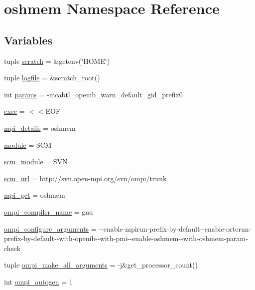 \hypertarget{namespaceoshmem}{\section{oshmem Namespace Reference}
\label{namespaceoshmem}
}
\subsection*{Variables}
\begin{DoxyCompactItemize}
\item 
tuple \hyperlink{namespaceoshmem_ac804c2050f1631747356112f02a6fa05}{scratch} = \&getenv(\char`\"{}H\-O\-M\-E\char`\"{})
\item 
tuple \hyperlink{namespaceoshmem_a0dd8ce9816b9130b80561197098590a2}{logfile} = \&scratch\-\_\-root()
\item 
int \hyperlink{namespaceoshmem_ab8b5930fba684193f3e00879ebb696b4}{params} = -\/mcabtl\-\_\-openib\-\_\-warn\-\_\-default\-\_\-gid\-\_\-prefix0
\item 
\hyperlink{namespaceoshmem_a024aa040d2607b8bd6fb76522b0978c3}{exec} = $<$$<$E\-O\-F
\item 
\hyperlink{namespaceoshmem_aeba1fd4df4f5814da0588fb749d7acfa}{mpi\-\_\-details} = oshmem
\item 
\hyperlink{namespaceoshmem_a9406859c141622f8f2f7210af080e99c}{module} = S\-C\-M
\item 
\hyperlink{namespaceoshmem_ab8796141a8629f1cfaedd19737a327c4}{scm\-\_\-module} = S\-V\-N
\item 
\hyperlink{namespaceoshmem_a6be12ee0b0ec67ddd588e8fe63960fa9}{scm\-\_\-url} = http\-://svn.\-open-\/mpi.\-org/svn/ompi/trunk
\item 
\hyperlink{namespaceoshmem_a4426807cb10649f44b732f4360d67069}{mpi\-\_\-get} = oshmem
\item 
\hyperlink{namespaceoshmem_a1ba136fa8004e20e4cebfc4fc401869f}{ompi\-\_\-compiler\-\_\-name} = gnu
\item 
\hyperlink{namespaceoshmem_a475fb23b33601f8274529d037c5f5ccc}{ompi\-\_\-configure\-\_\-arguments} = -\/-\/enable-\/mpirun-\/prefix-\/by-\/default-\/-\/enable-\/orterun-\/prefix-\/by-\/default-\/-\/with-\/openib-\/-\/with-\/pmi-\/-\/enable-\/oshmem-\/-\/with-\/oshmem-\/param-\/check
\item 
tuple \hyperlink{namespaceoshmem_a81040e875d1354d954835bd3fb1639d2}{ompi\-\_\-make\-\_\-all\-\_\-arguments} = -\/j\&get\-\_\-processor\-\_\-count()
\item 
int \hyperlink{namespaceoshmem_a44a772104c935ce09c4ddfd8a449cad3}{ompi\-\_\-autogen} = 1
$$
\end{DoxyCompactItemize}
